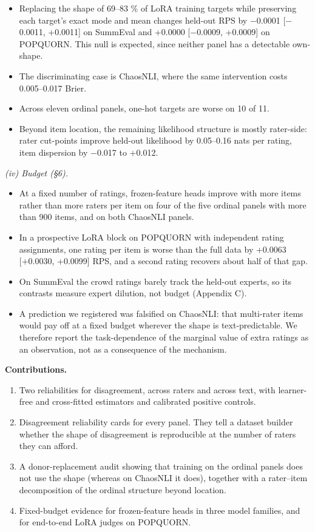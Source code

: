 \documentclass[10pt,twocolumn]{article}
\providecommand{\tightlist}{\setlength{\itemsep}{0pt}\setlength{\parskip}{0pt}}
\begin{document}
\begin{itemize}
\tightlist
\item
  Replacing the shape of 69--83 \% of LoRA training targets while preserving each target's exact mode and mean changes held-out RPS by $-$0.0001 {[}$-$0.0011, +0.0011{]} on SummEval and +0.0000 {[}$-$0.0009, +0.0009{]} on POPQUORN. This null is expected, since neither panel has a detectable own-shape.
\item
  The discriminating case is ChaosNLI, where the same intervention costs 0.005--0.017 Brier.
\item
  Across eleven ordinal panels, one-hot targets are worse on 10 of 11.
\item
  Beyond item location, the remaining likelihood structure is mostly rater-side: rater cut-points improve held-out likelihood by 0.05--0.16 nats per rating, item dispersion by $-$0.017 to +0.012.
\end{itemize}

\emph{(iv) Budget (\S{}6).}

\begin{itemize}
\tightlist
\item
  At a fixed number of ratings, frozen-feature heads improve with more items rather than more raters per item on four of the five ordinal panels with more than 900 items, and on both ChaosNLI panels.
\item
  In a prospective LoRA block on POPQUORN with independent rating assignments, one rating per item is worse than the full data by +0.0063 {[}+0.0030, +0.0099{]} RPS, and a second rating recovers about half of that gap.
\item
  On SummEval the crowd ratings barely track the held-out experts, so its contrasts measure expert dilution, not budget (Appendix C).
\item
  A prediction we registered was falsified on ChaosNLI: that multi-rater items would pay off at a fixed budget wherever the shape is text-predictable. We therefore report the task-dependence of the marginal value of extra ratings as an observation, not as a consequence of the mechanism.
\end{itemize}

\textbf{Contributions.}

\begin{enumerate}
\def\labelenumi{\arabic{enumi}.}
\tightlist
\item
  Two reliabilities for disagreement, across raters and across text, with learner-free and cross-fitted estimators and calibrated positive controls.
\item
  Disagreement reliability cards for every panel. They tell a dataset builder whether the shape of disagreement is reproducible at the number of raters they can afford.
\item
  A donor-replacement audit showing that training on the ordinal panels does not use the shape (whereas on ChaosNLI it does), together with a rater--item decomposition of the ordinal structure beyond location.
\item
  Fixed-budget evidence for frozen-feature heads in three model families, and for end-to-end LoRA judges on POPQUORN.
\end{enumerate}
\end{document}
